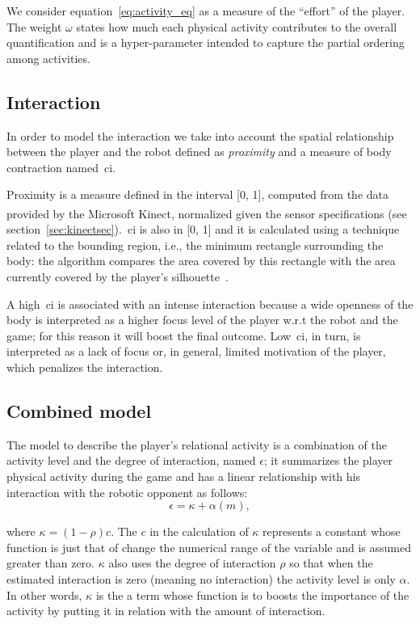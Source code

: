 We consider equation~\ref{eq:activity_eq} as a measure of the ``effort'' of the player. The weight $\omega$ states how much each physical activity contributes to the overall quantification and is a hyper-parameter intended to capture the partial ordering among activities.

\subsection{Interaction}\label{Interaction}
In order to model the interaction we take into account the spatial relationship between the player and the robot defined as \textit{proximity} and a measure of body contraction named~\gls{ci}.

Proximity is a measure defined in the interval [0, 1], computed from the data provided by the Microsoft Kinect\textsuperscript{\textregistered}, normalized given the sensor specifications (see section~\ref{sec:kinectsec}).~\gls{ci} is also in [0, 1] and it is calculated using a technique related to the bounding region, i.e., the minimum rectangle surrounding the body: the algorithm compares the area covered by this rectangle with the area currently covered by the player's silhouette~\citep{castellano_recognising_2007}.

A high~\gls{ci} is associated with an intense interaction because a wide openness of the body is interpreted as a higher focus level of the player w.r.t the robot and the game; for this reason it will boost the final outcome. Low~\gls{ci}, in turn, is interpreted as a lack of focus or, in general, limited motivation of the player, which penalizes the interaction.%

\subsection{Combined model}\label{sec:engagement}
The model to describe the player's relational activity is a combination of the activity level and the degree of interaction, named $\epsilon$; it summarizes the player physical activity during the game and has a linear relationship with his interaction with the robotic opponent as follows: 
\begin{equation}
\label{enagementeq}
\epsilon=\kappa + \alpha(m),
\end{equation}

where $\kappa= (1-\rho)c$.  The $c$ in the calculation of $\kappa$ represents a constant whose function is just that of change the numerical range of the variable and is assumed greater than zero. $\kappa$ also uses the degree of interaction $\rho$ so that when the estimated interaction is zero (meaning no interaction) the activity level is only $\alpha$. In other words, $\kappa$ is the a term whose function is to boosts the importance of the activity by putting it in relation with the amount of interaction. 

